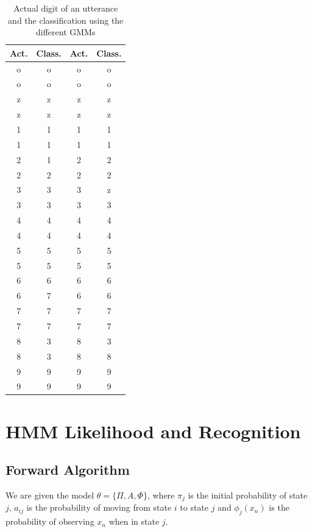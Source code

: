 \documentclass[12pt,a4paper,oneside]{article}
\begin{document}
\begin{table}[!ht]
\begin{center}
\footnotesize
\caption{Actual digit of an utterance and the classification using the different GMMs} \label{tab:GMM_class}
    \begin{tabular}{||c|c||c|c||}
    \hline
    Act. & Class. & Act. & Class. \\
    \hline
    o & o & o & o \\
    o & o & o & o \\
    z & z & z & z \\
    z & z & z & z \\
    1 & 1 & 1 & 1 \\
    1 & 1 & 1 & 1 \\
    2 & 1 & 2 & 2 \\
    2 & 2 & 2 & 2 \\
    3 & 3 & 3 & z \\
    3 & 3 & 3 & 3 \\
    4 & 4 & 4 & 4 \\
    4 & 4 & 4 & 4 \\
    5 & 5 & 5 & 5 \\
    5 & 5 & 5 & 5 \\
    6 & 6 & 6 & 6 \\
    6 & 7 & 6 & 6 \\
    7 & 7 & 7 & 7 \\
    7 & 7 & 7 & 7 \\
    8 & 3 & 8 & 3 \\
    8 & 3 & 8 & 8 \\
    9 & 9 & 9 & 9 \\
    9 & 9 & 9 & 9 \\
    \hline
    \end{tabular}
    \end{center}
\end{table}


\section{HMM Likelihood and Recognition}

\subsection{Forward Algorithm}
We are given the model $\theta = \{ \Pi, A, \Phi \}$, where $\pi_j$ is the initial probability of state $j$, $a_{ij}$ is the probability of moving from state $i$ to state $j$ and $\phi_j(x_n)$ is the probability of observing $x_n$ when in state $j$. 
%
\end{document}
